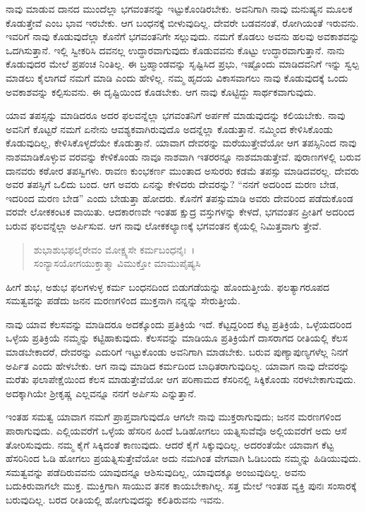ನಾವು ಮಾಡುವ ದಾನದ ಮುಂದೆಲ್ಲಾ ಭಗವಂತನನ್ನು ಇಟ್ಟುಕೊಂಡಿರಬೇಕು. ಅವನಿಗಾಗಿ ನಾವು ಮನುಷ್ಯನ ಮೂಲಕ ಕೊಡುತ್ತೇವೆ ಎಂಬ ಭಾವ ಇರಬೇಕು. ಆಗ ಬಂಧನಕ್ಕೆ ಬೀಳುವುದಿಲ್ಲ. ದೇವರೇ ಬಡವನಂತೆ, ರೋಗಿಯಂತೆ ಇರುವನು. ಇವರಿಗೆ ನಾವು ಕೊಡುವುದೆಲ್ಲಾ ಕೊನೆಗೆ ಭಗವಂತನಿಗೇ ಸಲ್ಲುವುದು. ನಮಗೆ ಕೊಡಲು ಅವನು ಹಲವು ಅವಕಾಶವನ್ನು ಒದಗಿಸುತ್ತಾನೆ. ಇಲ್ಲಿ ಸ್ವೀಕರಿಸಿ ದವನಲ್ಲ ಉದ್ಧಾರವಾಗುವುದು ಕೊಡುವವನು ಕೊಟ್ಟು ಉದ್ಧಾರವಾಗುತ್ತಾನೆ. ನಾನು ಕೊಡುವುದರ ಮೇಲೆ ಪ್ರಪಂಚ ನಿಂತಿಲ್ಲ. ಈ ಬ್ರಹ್ಮಾಂಡವನ್ನು ಸೃಷ್ಟಿಸಿದ ಪ್ರಭು, ಇಷ್ಟೊಂದು ಮಾಡಿದವನಿಗೆ ಇನ್ನು ಸ್ವಲ್ಪ ಮಾಡಲು ಕೈಲಾಗದೆ ನಮಗೆ ಮಾಡಿ ಎಂದು ಹೇಳಿಲ್ಲ. ನಮ್ಮ ಹೃದಯ ವಿಕಾಸವಾಗಲು ನಾವು ಕೊಡುವುದಕ್ಕೆ ಒಂದು ಅವಕಾಶವನ್ನು ಕಲ್ಪಿಸುವನು. ಈ ದೃಷ್ಟಿಯಿಂದ ಕೊಡಬೇಕು. ಆಗ ನಾವು ಕೊಟ್ಟಿದ್ದು ಸಾರ್ಥಕವಾಗುವುದು.

ಯಾವ ತಪಸ್ಸನ್ನು ಮಾಡಿದರೂ ಅದರ ಫಲವನ್ನೆಲ್ಲಾ ಭಗವಂತನಿಗೆ ಅರ್ಪಣೆ ಮಾಡುವುದನ್ನು ಕಲಿಯಬೇಕು. ನಾವು ಅವನಿಗೆ ಕೊಟ್ಟರೆ ನಮಗೆ ಏನೇನು ಆವಶ್ಯಕವಾಗಿರುವುದೊ ಅದನ್ನೆಲ್ಲಾ ಕೊಡುತ್ತಾನೆ. ನಮ್ಮಿಂದ ಕೇಳಿಸಿಕೊಂಡು ಕೊಡುವುದಿಲ್ಲ, ಕೇಳಿಸಿಕೊಳ್ಳದೆಯೇ ಕೊಡುತ್ತಾನೆ. ಯಾವಾಗ ದೇವರನ್ನು ಮರೆಯುತ್ತೇವೆಯೋ ಆಗ ತಪಸ್ಸಿನಿಂದ ನಾವು ನಾಶಮಾಡಿಕೊಳ್ಳುವ ವರವನ್ನು ಕೇಳಿಕೊಂಡು ನಾವೂ ನಾಶವಾಗಿ ಇತರರನ್ನೂ ನಾಶಮಾಡುತ್ತೇವೆ. ಪುರಾಣಗಳಲ್ಲಿ ಬರುವ ದಾನವರು ಕಠೋರ ತಪಸ್ವಿಗಳು. ರಾವಣ ಕುಂಭಕರ್ಣ ಮುಂತಾದ ಅಸುರರು ಕಡಮೆ ತಪಸ್ಸು ಮಾಡಿದವರಲ್ಲ. ದೇವರು ಅವರ ತಪಸ್ಸಿಗೆ ಒಲಿದು ಬಂದ. ಆಗ ಅವರು ಏನನ್ನು ಕೇಳಿದರು ದೇವರನ್ನು? “ನನಗೆ ಅದರಿಂದ ಮರಣ ಬೇಡ, ಇದರಿಂದ ಮರಣ ಬೇಡ” ಎಂದು ಬೇಡುತ್ತಾ ಹೋದರು. ಕೊನೆಗೆ ತಪಸ್ಸುಮಾಡಿ ಅವರು ದೇವರಿಂದ ಪಡೆದುಕೊಂಡ ವರವೇ ಲೋಕಕಂಟಕ ವಾಯಿತು. ಆದಕಾರಣವೇ ಇಂತಹ ಕ್ಷುದ್ರ ವಸ್ತುಗಳನ್ನು ಕೇಳದೆ, ಭಗವಂತನ ಪ್ರೀತಿಗೆ ಅದರಿಂದ ಬರುವ ಫಲವನ್ನೆಲ್ಲಾ ಅರ್ಪಿಸುವ. ಆಗ ನಾವು ಲೋಕಕಲ್ಯಾಣಕ್ಕೆ ಭಗವಂತನ ಕೈಯಲ್ಲಿ ನಿಮಿತ್ತವಾಗು ತ್ತೇವೆ.

\begin{verse}
ಶುಭಾಶುಭಫಲೈರೇವಂ ಮೋಕ್ಷ್ಯಸೇ ಕರ್ಮಬಂಧನೈಃ~।\\ಸಂನ್ಯಾಸಯೋಗಯುಕ್ತಾತ್ಮಾ ವಿಮುಕ್ತೋ ಮಾಮುಪೈಷ್ಯಸಿ 
\end{verse}

{\small ಹೀಗೆ ಶುಭ, ಅಶುಭ ಫಲಗಳುಳ್ಳ ಕರ್ಮ ಬಂಧನದಿಂದ ಬಿಡುಗಡೆಯನ್ನು ಹೊಂದುತ್ತೀಯೆ. ಫಲತ್ಯಾಗರೂಪದ ಸಮತ್ವವನ್ನು ಪಡೆದು ಜನನ ಮರಣಗಳಿಂದ ಮುಕ್ತನಾಗಿ ನನ್ನನ್ನು ಸೇರುತ್ತೀಯೆ.}

ನಾವು ಯಾವ ಕೆಲಸವನ್ನು ಮಾಡಿದರೂ ಅದಕ್ಕೊಂದು ಪ್ರತಿಕ್ರಿಯೆ ಇದೆ. ಕೆಟ್ಟದ್ದರಿಂದ ಕೆಟ್ಟ ಪ್ರತಿಕ್ರಿಯೆ, ಒಳ್ಳೆಯದರಿಂದ ಒಳ್ಳೆಯ ಪ್ರತಿಕ್ರಿಯೆ ನಮ್ಮನ್ನು ಕಟ್ಟಿಹಾಕುವುದು. ಕೆಲಸವನ್ನು ಮಾಡಿಯೂ ಪ್ರತಿಕ್ರಿಯೆಗೆ ದಾಸರಾಗದ ರೀತಿಯಲ್ಲಿ ಕೆಲಸ ಮಾಡಬೇಕಾದರೆ, ದೇವರನ್ನು ಎದುರಿಗೆ ಇಟ್ಟುಕೊಂಡು ಅವನಿಗಾಗಿ ಮಾಡಬೇಕು. ಬರುವ ಪುಣ್ಯಾಪುಣ್ಯಗಳೆಲ್ಲ ನಿನಗೆ ಅರ್ಪಿತ ಎಂದು ಹೇಳಬೇಕು. ಆಗ ನಾವು ಮಾಡಿದ ಕರ್ಮದಿಂದ ಬಾಧಿತರಾಗುವುದಿಲ್ಲ. ಯಾವಾಗ ನಾವು ದೇವರನ್ನು ಮರೆತು ಫಲಾಪೇಕ್ಷೆಯಿಂದ ಕೆಲಸ ಮಾಡುತ್ತೇವೆಯೋ ಆಗ ಪರಿಣಾಮದ ಕೆಸರಿನಲ್ಲಿ ಸಿಕ್ಕಿಕೊಂಡು ನರಳಬೇಕಾಗುವುದು. ಅದಕ್ಕಾಗಿಯೇ ಶ‍್ರೀಕೃಷ್ಣ ಎಲ್ಲವನ್ನೂ ನನಗೆ ಅರ್ಪಿಸು ಎನ್ನುತ್ತಾನೆ.

ಇಂತಹ ಸಮತ್ವ ಯಾವಾಗ ನಮಗೆ ಪ್ರಾಪ್ತವಾಗುವುದೊ ಆಗಲೇ ನಾವು ಮುಕ್ತರಾಗುವುದು; ಜನನ ಮರಣಗಳಿಂದ ಪಾರಾಗುವುದು. ಎಲ್ಲಿಯವರೆಗೆ ಒಳ್ಳೆಯ ಹೆಸರಿನ ಹಿಂದೆ ಓಡಿಹೋಗಲು ಯತ್ನಿಸುವೆವೊ ಅಲ್ಲಿಯವರೆಗೆ ಅದು ಆಸೆ ತೋರಿಸುವುದು. ನಮ್ಮ ಕೈಗೆ ಸಿಕ್ಕಿದಂತೆ ಕಾಣುವುದು. ಆದರೆ ಕೈಗೆ ಸಿಕ್ಕುವುದಿಲ್ಲ. ಅದರಂತೆಯೇ ಯಾವಾಗ ಕೆಟ್ಟ ಹೆಸರಿನಿಂದ ಓಡಿ ಹೋಗಲು ಪ್ರಯತ್ನಿಸುತ್ತೇವೆಯೋ ಅದು ನಮಗಿಂತ ವೇಗವಾಗಿ ಓಡಿಬಂದು ನಮ್ಮನ್ನು ಹಿಡಿಯುವುದು. ಸಮತ್ವವನ್ನು ಪಡೆದಿರುವವನು ಯಾವುದನ್ನೂ ಆಶಿಸುವುದಿಲ್ಲ, ಯಾವುದಕ್ಕೂ ಅಂಜುವುದಿಲ್ಲ. ಅವನು ಬದುಕಿರುವಾಗಲೇ ಮುಕ್ತ. ಮುಕ್ತಿಗಾಗಿ ಸಾಯುವ ತನಕ ಕಾಯಬೇಕಾಗಿಲ್ಲ. ಸತ್ತ ಮೇಲೆ ಇಂತಹ ವ್ಯಕ್ತಿ ಪುನಃ ಸಂಸಾರಕ್ಕೆ ಬರುವುದಿಲ್ಲ. ಬರದ ರೀತಿಯಲ್ಲಿ ಹೋಗುವುದನ್ನು ಕಲಿತಿರುವನು ಇವನು.


